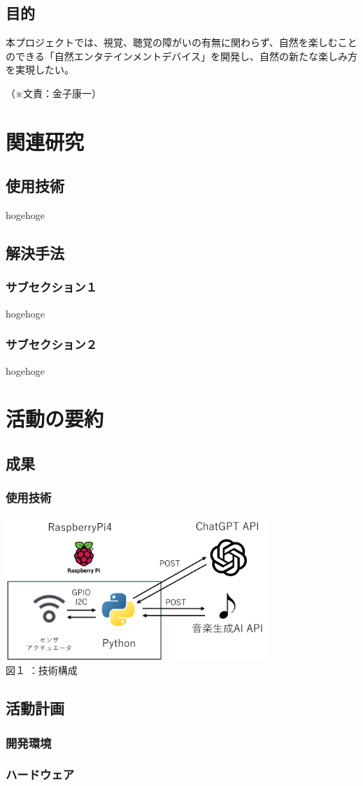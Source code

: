 \documentclass[11pt,a4paper]{report}
\newcommand{\Writer}[1]{
  \normalsize
  \begin{flushright}
    （※文責：#1）
  \end{flushright}
}
\begin{document}
\section{目的}
\noindent\space
本プロジェクトでは、視覚、聴覚の障がいの有無に関わらず、自然を楽しむことのできる「自然エンタテインメントデバイス」を開発し、自然の新たな楽しみ方を実現したい。
\Writer{金子康一}

\chapter{関連研究}
\section{使用技術}
\noindent\space
hogehoge
\section{解決手法}
\subsection{サブセクション１}
\noindent
hogehoge
\subsection{サブセクション２}
\noindent
hogehoge

\chapter{活動の要約}
\section{成果}
\noindent\space
\subsection{使用技術}
\begin{center}
  \includegraphics[width=100mm]{images/tech-conf.png}\\
  図１  ：技術構成
\end{center}
\section{活動計画}\noindent
\subsection{開発環境}
\subsection{ハードウェア}
\end{document}
